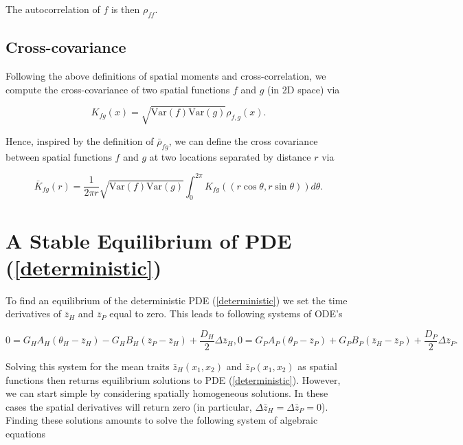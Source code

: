 \documentclass{article}
\begin{document}
The autocorrelation of \(f\) is then \(\rho_{ff}\).

\hypertarget{cross-covariance}{%
\subsection{Cross-covariance}\label{cross-covariance}}

Following the above definitions of spatial moments and
cross-correlation, we compute the cross-covariance of two spatial
functions \(f\) and \(g\) (in 2D space) via

\begin{equation}
  K_{fg}(x)=\sqrt{\mathrm{Var}(f)\mathrm{Var}(g)}\rho_{f,g}(x).
\end{equation}

Hence, inspired by the definition of \(\bar\rho_{fg}\), we can define
the cross covariance between spatial functions \(f\) and \(g\) at two
locations separated by distance \(r\) via

\begin{equation}
  \bar K_{fg}(r)=\frac{1}{2\pi r}\sqrt{\mathrm{Var}(f)\mathrm{Var}(g)}\int_0^{2\pi}K_{fg}((r\cos\theta,r\sin\theta))d\theta.
\end{equation}

\hypertarget{a-stable-equilibrium-of-pde}{%
\section{\texorpdfstring{A Stable Equilibrium of PDE
(\ref{deterministic})}{A Stable Equilibrium of PDE ()}}\label{a-stable-equilibrium-of-pde}}

To find an equilibrium of the deterministic PDE (\ref{deterministic}) we
set the time derivatives of \(\bar z_H\) and \(\bar z_P\) equal to zero.
This leads to following systems of ODE's

\begin{subequations}
  \begin{equation}
    0=G_HA_H(\theta_H-\bar z_H)-G_HB_H(\bar z_P-\bar z_H)+\frac{D_H}{2}\Delta\bar z_H,
  \end{equation}
  \begin{equation}
    0=G_PA_P(\theta_P-\bar z_P)+G_PB_P(\bar z_H-\bar z_P)+\frac{D_P}{2}\Delta\bar z_P.
  \end{equation}
\end{subequations}

Solving this system for the mean traits \(\bar z_H(x_1,x_2)\) and
\(\bar z_P(x_1,x_2)\) as spatial functions then returns equilibrium
solutions to PDE (\ref{deterministic}). However, we can start simple by
considering spatially homogeneous solutions. In these cases the spatial
derivatives will return zero (in particular,
\(\Delta\bar z_H=\Delta\bar z_P=0\)). Finding these solutions amounts to
solve the following system of algebraic equations
\end{document}
